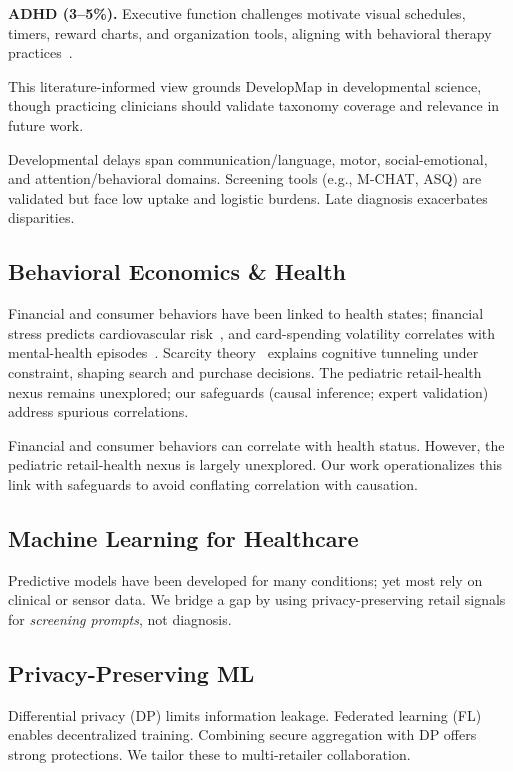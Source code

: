 \documentclass[conference]{IEEEtran}
\theoremstyle{plain}
\theoremstyle{remark}
\begin{document}
\textbf{ADHD (3--5\%).}
Executive function challenges motivate visual schedules, timers, reward charts, and organization tools, aligning with behavioral therapy practices~\cite{adhdbehavior}.

This literature-informed view grounds DevelopMap in developmental science, though practicing clinicians should validate taxonomy coverage and relevance in future work.

Developmental delays span communication/language, motor, social-emotional, and attention/behavioral domains. Screening tools (e.g., M-CHAT, ASQ) are validated but face low uptake and logistic burdens. Late diagnosis exacerbates disparities.

\subsection{Behavioral Economics \& Health}
Financial and consumer behaviors have been linked to health states; financial stress predicts cardiovascular risk~\cite{mhealth1}, and card-spending volatility correlates with mental-health episodes~\cite{mhealth2}. Scarcity theory~\cite{scarcity} explains cognitive tunneling under constraint, shaping search and purchase decisions. The pediatric retail-health nexus remains unexplored; our safeguards (causal inference; expert validation) address spurious correlations.

Financial and consumer behaviors can correlate with health status. However, the pediatric retail-health nexus is largely unexplored. Our work operationalizes this link with safeguards to avoid conflating correlation with causation.

\subsection{Machine Learning for Healthcare}
Predictive models have been developed for many conditions; yet most rely on clinical or sensor data. We bridge a gap by using privacy-preserving retail signals for \emph{screening prompts}, not diagnosis.

\subsection{Privacy-Preserving ML}
Differential privacy (DP) limits information leakage. Federated learning (FL) enables decentralized training. Combining secure aggregation with DP offers strong protections. We tailor these to multi-retailer collaboration.
\end{document}
